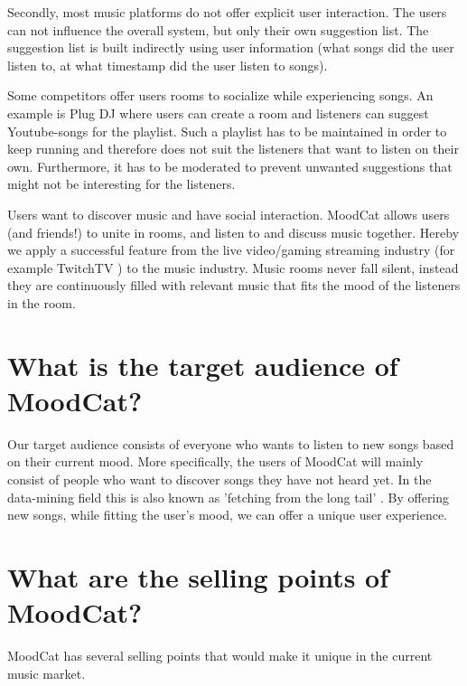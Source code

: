 Secondly, most music platforms do not offer explicit user interaction.
The users can not influence the overall system, but only their own suggestion list.
The suggestion list is built indirectly using user information (what songs did the user listen to, at what timestamp did the user listen to songs).

Some competitors offer users rooms to socialize while experiencing songs.
An example is Plug DJ \cite{PlugDJ} where users can create a room and listeners can suggest Youtube-songs\cite{Youtube} for the playlist.
Such a playlist has to be maintained in order to keep running and therefore does not suit the listeners that want to listen on their own.
Furthermore, it has to be moderated to prevent unwanted suggestions that might not be interesting for the listeners.

\bigskip 

Users want to discover music and have social interaction.
MoodCat allows users (and friends!) to unite in rooms, and listen to and discuss music together.
Hereby we apply a successful feature from the live video/gaming streaming industry (for example TwitchTV \cite{Twitch}) to the music industry.
Music rooms never fall silent, instead they are continuously filled with relevant music that fits the mood of the listeners in the room.

\chapter{What is the target audience of MoodCat?}
Our target audience consists of everyone who wants to listen to new songs based on their current mood.
More specifically, the users of MoodCat will mainly consist of people who want to discover songs they have not heard yet.
In the data-mining field this is also known as 'fetching from the long tail' \cite{longtail}.
By offering new songs, while fitting the user's mood, we can offer a unique user experience.

\chapter{What are the selling points of MoodCat?}
MoodCat has several selling points that would make it unique in the current music market.

